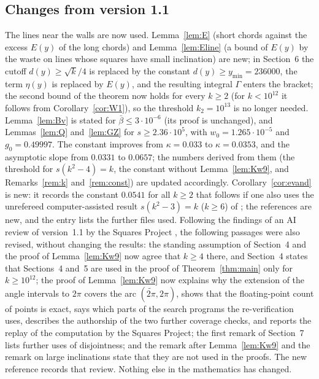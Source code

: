 \documentclass[11pt]{amsart}
\theoremstyle{definition}
\theoremstyle{remark}
\begin{document}
\subsection*{Changes from version 1.1}
The lines near the walls are now used. Lemma~\ref{lem:E} (short chords against the excess $E(y)$ of the long chords) and
Lemma~\ref{lem:Eline} (a bound of $E(y)$ by the waste on lines whose squares have small inclination) are new; in Section~6 the
cutoff $d(y)\ge\sqrt k/4$ is replaced by the constant $d(y)\ge y_{\min}=236000$, the term $\eta(y)$ is replaced by $E(y)$, and the
resulting integral $\Gamma$ enters the bracket; the second bound of the theorem now holds for every $k\ge2$ (for $k<10^{12}$ it follows
from Corollary~\ref{cor:W1}), so the threshold $k_2=10^{13}$ is no longer needed. Lemma~\ref{lem:Bv} is stated for
$\bar\beta\le3\cdot10^{-6}$ (its proof is unchanged), and Lemmas~\ref{lem:Q} and~\ref{lem:GZ} for $s\ge2.36\cdot10^5$, with
$w_0=1.265\cdot10^{-5}$ and $g_0=0.49997$. The constant improves from $\kappa=0.033$ to $\kappa=0.0353$, and the asymptotic slope from
$0.0331$ to $0.0657$; the numbers derived from them (the threshold for $s(k^2-4)=k$, the constant without Lemma~\ref{lem:Kw9}, and
Remarks~\ref{rem:k} and~\ref{rem:const}) are updated accordingly. Corollary~\ref{cor:evand} is new: it records the constant
$0.0541$ for all $k\ge2$ that follows if one also uses the unrefereed computer-assisted result $s(k^2-3)=k$ ($k\ge6$) of \cite{Dan};
the references \cite{Lev,Wan} are new, and the entry \cite{Dan} lists the further files used. Following the findings of an AI review of
version~1.1 by the Squares Project \cite{LevR}, the following passages were also revised, without changing the results: the standing
assumption of Section~4 and the proof of Lemma~\ref{lem:Kw9} now agree that $k\ge4$ there, and Section~4 states that Sections~4 and~5 are
used in the proof of Theorem~\ref{thm:main} only for $k\ge10^{12}$; the proof of Lemma~\ref{lem:Kw9} now explains why the extension of the
angle intervals to $2\pi$ covers the arc $(\widetilde{2\pi},2\pi)$, shows that the floating-point count of points is exact, says which
parts of the search programs the re-verification uses, describes the authorship of the two further coverage checks, and reports the
replay of the computation by the Squares Project; the first remark of Section~7 lists further uses of disjointness; and the remark after
Lemma~\ref{lem:Kw9} and the remark on large inclinations state that they are not used in the proofs. The new reference \cite{LevR} records
that review. Nothing else in the mathematics has changed.
\end{document}
